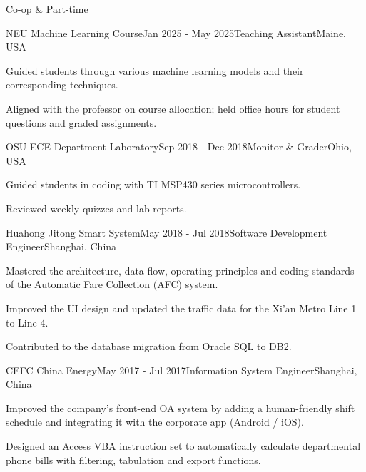 \documentclass{resume} %
\begin{document}
\begin{rSection}{Co-op \& Part-time}

    \begin{rSubsection}{NEU Machine Learning Course}{Jan 2025 - May 2025}{Teaching Assistant}{Maine, USA}
        \item Guided students through various machine learning models and their corresponding techniques.
        \item Aligned with the professor on course allocation; held office hours for student questions and graded assignments.
    \end{rSubsection}

    \begin{rSubsection}{OSU ECE Department Laboratory}{Sep 2018 - Dec 2018}{Monitor \& Grader}{Ohio, USA}
        \item Guided students in coding with TI MSP430 series microcontrollers.
        \item Reviewed weekly quizzes and lab reports.
    \end{rSubsection}

    \begin{rSubsection}{Huahong Jitong Smart System}{May 2018 - Jul 2018}{Software Development Engineer}{Shanghai, China}
        \item Mastered the architecture, data flow, operating principles and coding standards of the Automatic Fare Collection (AFC) system.
        \item Improved the UI design and updated the traffic data for the Xi'an Metro Line 1 to Line 4.
        \item Contributed to the database migration from Oracle SQL to DB2.
    \end{rSubsection}

    \begin{rSubsection}{CEFC China Energy}{May 2017 - Jul 2017}{Information System Engineer}{Shanghai, China}
        \item Improved the company's front-end OA system by adding a human-friendly shift schedule and integrating it with the corporate app (Android / iOS).
        \item Designed an Access VBA instruction set to automatically calculate departmental phone bills with filtering, tabulation and export functions.
    \end{rSubsection}

\end{rSection}

\end{document}
